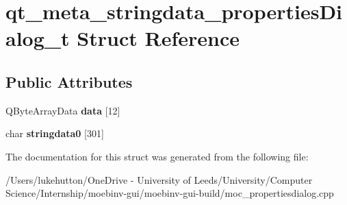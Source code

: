 \hypertarget{structqt__meta__stringdata__properties_dialog__t}{}\section{qt\+\_\+meta\+\_\+stringdata\+\_\+properties\+Dialog\+\_\+t Struct Reference}
\label{structqt__meta__stringdata__properties_dialog__t}
\subsection*{Public Attributes}
\begin{DoxyCompactItemize}
\item 
\mbox{\label{structqt__meta__stringdata__properties_dialog__t_aa71dc9d1b968b4d464780a0866324358}} 
Q\+Byte\+Array\+Data {\bfseries data} \mbox{[}12\mbox{]}
\item 
\mbox{\label{structqt__meta__stringdata__properties_dialog__t_aac0560d60639d4b7df0e60e4289923b6}} 
char {\bfseries stringdata0} \mbox{[}301\mbox{]}
\end{DoxyCompactItemize}


The documentation for this struct was generated from the following file\+:\begin{DoxyCompactItemize}
\item 
/\+Users/lukehutton/\+One\+Drive -\/ University of Leeds/\+University/\+Computer Science/\+Internship/moebinv-\/gui/moebinv-\/gui-\/build/moc\+\_\+propertiesdialog.\+cpp\end{DoxyCompactItemize}
